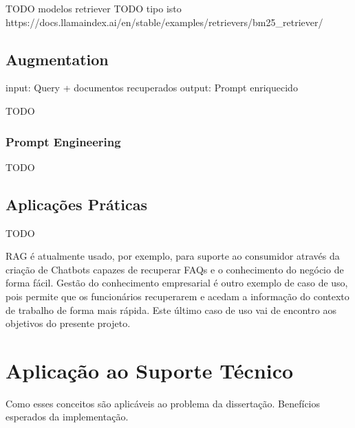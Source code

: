 TODO modelos retriever
TODO tipo isto https://docs.llamaindex.ai/en/stable/examples/retrievers/bm25_retriever/


\subsection{Augmentation}
\label{augmentation}

input: Query + documentos recuperados
output: Prompt enriquecido

TODO

\subsubsection{Prompt Engineering}

TODO

\subsection{Aplicações Práticas}

TODO 

RAG é atualmente usado, por exemplo, para suporte ao consumidor através da criação de Chatbots capazes de recuperar FAQs e o conhecimento do negócio de forma fácil. Gestão do conhecimento empresarial é outro exemplo de caso de uso, pois permite que os funcionários recuperarem e acedam a informação do contexto de trabalho de forma mais rápida. Este último caso de uso vai de encontro aos objetivos do presente projeto. 



\section{Aplicação ao Suporte Técnico}

Como esses conceitos são aplicáveis ao problema da dissertação.
Benefícios esperados da implementação.
